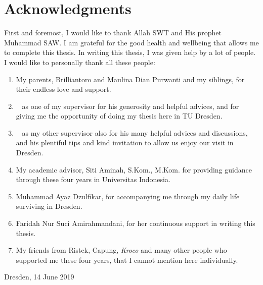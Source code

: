 \chapter*{Acknowledgments}

First and foremost, I would like to thank Allah SWT and His prophet Muhammad SAW.
I am grateful for the good health and wellbeing that allows me to complete this thesis.
In writing this thesis, I was given help by a lot of people.
I would like to personally thank all these people:

\begin{enumerate}
    \item My parents, Brilliantoro and Maulina Dian Purwanti and my siblings, for their endless love and support.
    \item \pembimbing~ as one of my supervisor for his generosity and helpful advices, and for giving me the opportunity of doing my thesis here in TU Dresden.
    \item \pembimbingDua~ as my other supervisor also for his many helpful advices and discussions, and his plentiful tips and kind invitation to allow us enjoy our visit in Dresden.
    \item My academic advisor, Siti Aminah, S.Kom., M.Kom. for providing guidance through these four years in Universitas Indonesia.
    \item Muhammad Ayaz Dzulfikar, for accompanying me through my daily life surviving in Dresden.
    \item Faridah Nur Suci Amirahmandani, for her continuous support in writing this thesis.
    \item My friends from Ristek, Capung, \emph{Kroco} and many other people who supported me these four years, that I cannot mention here individually.
\end{enumerate}

\vspace*{0.1cm}
\begin{flushright}
Dresden, 14 June 2019\\[0.1cm]
\vspace*{1cm}
\penulis

\end{flushright}
